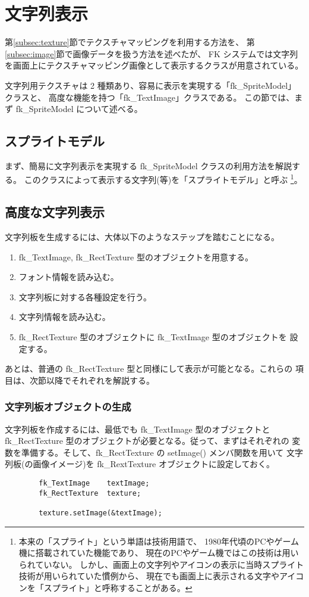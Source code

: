 \chapter{文字列表示} \label{sec:stringimage}
第\ref{subsec:texture}節でテクスチャマッピングを利用する方法を、
第\ref{subsec:image}節で画像データを扱う方法を述べたが、
FK システムでは文字列を画面上にテクスチャマッピング画像として表示するクラスが用意されている。

文字列用テクスチャは 2 種類あり、容易に表示を実現する「fk\_SpriteModel」クラスと、
高度な機能を持つ「fk\_TextImage」クラスである。
この節では、まず fk\_SpriteModel について述べる。

\section{スプライトモデル}
まず、簡易に文字列表示を実現する fk\_SpriteModel クラスの利用方法を解説する。
このクラスによって表示する文字列(等)を「スプライトモデル」と呼ぶ
\footnote{本来の「スプライト」という単語は技術用語で、
1980年代頃のPCやゲーム機に搭載されていた機能であり、
現在のPCやゲーム機ではこの技術は用いられていない。
しかし、画面上の文字列やアイコンの表示に当時スプライト技術が用いられていた慣例から、
現在でも画面上に表示される文字やアイコンを「スプライト」と呼称することがある。}。



\section{高度な文字列表示}

文字列板を生成するには、大体以下のようなステップを踏むことになる。
\begin{enumerate}
 \item fk\_TextImage, fk\_RectTexture 型のオブジェクトを用意する。
 \item フォント情報を読み込む。
 \item 文字列板に対する各種設定を行う。
 \item 文字列情報を読み込む。
 \item fk\_RectTexture 型のオブジェクトに fk\_TextImage 型のオブジェクトを
	設定する。
\end{enumerate}
あとは、普通の fk\_RectTexture 型と同様にして表示が可能となる。これらの
項目は、次節以降でそれぞれを解説する。

\subsection{文字列板オブジェクトの生成}
文字列板を作成するには、最低でも fk\_TextImage 型のオブジェクトと
fk\_RectTexture 型のオブジェクトが必要となる。従って、まずはそれぞれの
変数を準備する。そして、fk\_RectTexture の setImage() メンバ関数を用いて
文字列板(の画像イメージ)を fk\_RextTexture オブジェクトに設定しておく。
\\
\begin{screen}
\begin{verbatim}
        fk_TextImage    textImage;
        fk_RectTexture  texture;

        texture.setImage(&textImage);
\end{verbatim}
\end{screen}

